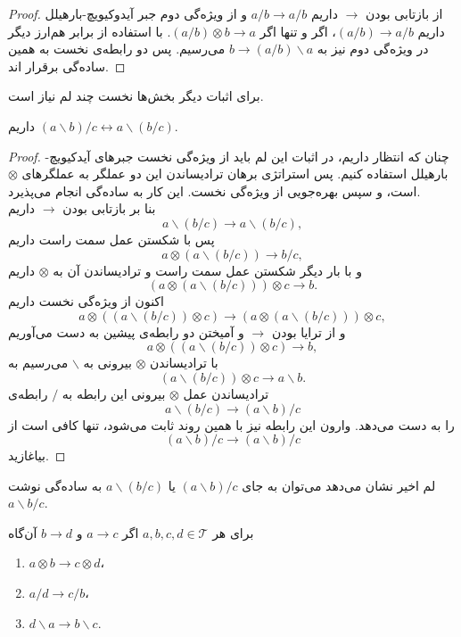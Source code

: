 \begin{proof}
از بازتابی بودن
$\rightarrow$
داریم
$a / b \rightarrow a / b$
و از ویژه‌گی دوم جبر آیدوکیویچ-بارهیلل داریم
$(a / b) \rightarrow a / b$،
اگر و تنها اگر
$(a / b) \otimes b \rightarrow a$.
با استفاده از برابر هم‌ارز دیگر در ویژه‌گی دوم نیز به
$b \rightarrow (a / b) \backslash a$
می‌رسیم.
پس دو رابطه‌ی نخست به همین ساده‌گی برقرار اند. 
\end{proof}

برای اثبات دیگر بخش‌ها نخست چند لم نیاز است.

\begin{lemma}
\label{lemma:1-2}
داریم 
$(a \backslash b) / c \leftrightarrow a \backslash (b / c)$.
\end{lemma}

\begin{proof}
چنان که انتظار داریم، در اثبات این لم باید از ویژه‌گی نخست جبرهای آیدکیویچ-بارهیلل استفاده کنیم.
پس استراتژی برهان ترادیساندن این دو عملگر به عملگرهای 
$\otimes$
است، و سپس بهره‌جویی از ویژه‌گی نخست. این کار به ساده‌گی انجام می‌پذیرد. \\
بنا بر بازتابی بودن 
$\rightarrow$
داریم
\[ a \backslash (b / c) \rightarrow a \backslash (b / c), \]
پس با شکستن عمل سمت راست داریم
\[ a \otimes (a \backslash (b / c)) \rightarrow b / c, \]
و با بار دیگر شکستن عمل سمت راست و ترادیساندن آن به 
$\otimes$
داریم
\[ (a \otimes (a \backslash (b / c))) \otimes c \rightarrow b. \]
اکنون از ویژه‌گی نخست داریم
\[ a \otimes ((a \backslash (b / c)) \otimes c) \rightarrow (a \otimes (a \backslash (b / c))) \otimes c, \]
و از ترایا بودن 
$\rightarrow$
و آمیختن دو رابطه‌ی پیشین به دست می‌آوریم
\[ a \otimes ((a \backslash (b / c)) \otimes c) \rightarrow b, \]
با ترادیساندن 
$\otimes$
بیرونی به 
$\backslash$
می‌رسیم به
\[ (a \backslash (b / c)) \otimes c \rightarrow a \backslash b. \]
ترادیساندن عمل
$\otimes$
بیرونی این رابطه به 
$/$
رابطه‌ی 
\[ a \backslash (b / c) \rightarrow (a \backslash b) / c \]
را به دست می‌دهد.
وارون این رابطه نیز با همین روند ثابت می‌شود، تنها کافی است از 
\[ (a \backslash b) / c \rightarrow (a \backslash b) / c \]
بیاغازید.
\end{proof}

لم اخیر نشان می‌دهد  می‌توان به جای
$(a \backslash b) / c$
یا
$a \backslash (b / c)$
به ساده‌گی نوشت
$a \backslash b / c$.

\begin{lemma}
\label{lemma:1-3}
برای هر
$a, b, c, d \in \mathcal{T}$
اگر
$a \rightarrow c$
و
$b \rightarrow d$
آن‌گاه
\begin{enumerate}
\item
$a \otimes b \rightarrow c \otimes d$،
\item
$a / d \rightarrow c / b$،
\item
$d \backslash a \rightarrow b \backslash c$.
\end{enumerate}
\end{lemma}

